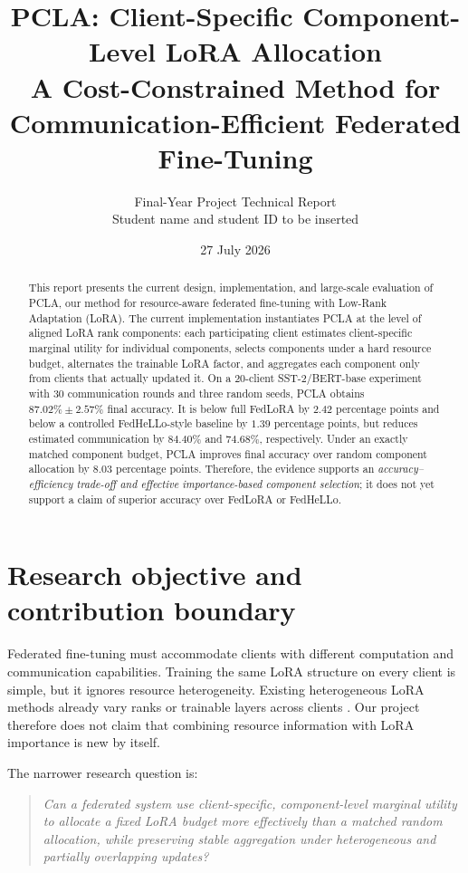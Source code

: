 \documentclass[11pt,a4paper]{article}
\title{\vspace{-1.2cm}
  \textbf{PCLA: Client-Specific Component-Level LoRA Allocation}\\
  \large A Cost-Constrained Method for Communication-Efficient Federated Fine-Tuning
}
\author{Final-Year Project Technical Report\\
  \small Student name and student ID to be inserted}
\date{27 July 2026}
\begin{document}
\maketitle

\begin{abstract}
This report presents the current design, implementation, and large-scale
evaluation of PCLA, our method for resource-aware federated fine-tuning with
Low-Rank Adaptation (LoRA). The current implementation instantiates PCLA at the
level of aligned LoRA rank components: each participating client estimates
client-specific marginal utility for individual components, selects components
under a hard resource budget, alternates the trainable LoRA factor, and
aggregates each component only from clients that actually updated it. On a
20-client SST-2/BERT-base experiment with 30 communication rounds and three
random seeds, PCLA obtains $87.02\%\pm2.57\%$ final accuracy. It is below full
FedLoRA by $2.42$ percentage points and below a controlled FedHeLLo-style
baseline by $1.39$ percentage points, but reduces estimated communication by
$84.40\%$ and $74.68\%$, respectively. Under an exactly matched component
budget, PCLA improves final accuracy over random component allocation by
$8.03$ percentage points. Therefore, the evidence supports an
\emph{accuracy--efficiency trade-off and effective importance-based component
selection}; it does not yet support a claim of superior accuracy over
FedLoRA or FedHeLLo.
\end{abstract}

\section{Research objective and contribution boundary}

Federated fine-tuning must accommodate clients with different computation and
communication capabilities. Training the same LoRA structure on every client
is simple, but it ignores resource heterogeneity. Existing heterogeneous LoRA
methods already vary ranks or trainable layers across clients
\cite{hetlora,flora,fedhello}. Our project therefore does not claim that
combining resource information with LoRA importance is new by itself.

The narrower research question is:
\begin{quote}
\emph{Can a federated system use client-specific, component-level marginal
utility to allocate a fixed LoRA budget more effectively than a matched random
allocation, while preserving stable aggregation under heterogeneous and
partially overlapping updates?}
\end{quote}
\end{document}
